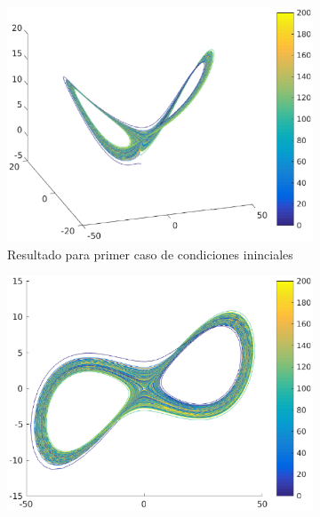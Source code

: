 \documentclass[12pt,letterpaper]{article}
\begin{document}

\begin{figure}
	\centering
	\begin{subfigure}[t]{0.36\textwidth}
		\includegraphics[width=\textwidth]{pictures/tercera_simulacion}
		\caption{Resultado para primer caso de condiciones ininciales}
		\label{fig:simulacion3}
	\end{subfigure}
	\begin{subfigure}[t]{0.36\textwidth}
		\includegraphics[width=\textwidth]{pictures/tercera_simulacion_xy}

\end{subfigure}
\end{figure}
\end{document}
